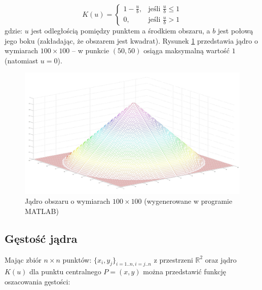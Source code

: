 \begin{equation}
\label{eq:ms3}
K(u)=\begin{cases}
1-\frac{u}{b}, & \text{jeśli }\frac{u}{b}\leq 1 \\
0, & \text{jeśli }\frac{u}{b} > 1
\end{cases}
\end{equation}
gdzie: $u$ jest odległością pomiędzy punktem a środkiem obszaru, a $b$ jest połową jego boku (zakładając, że obszarem jest kwadrat). Rysunek \ref{fig:kernel} przedstawia jądro o wymiarach $100\times 100$ -- w punkcie $(50,50)$ osiąga maksymalną wartość $1$ (natomiast $u=0$).
\begin{figure}[h]
	\centering
	\captionsetup{justification=centering,margin=1cm}
	\includegraphics[width=12cm]{2_kernel.jpg}
	\caption{Jądro obszaru o wymiarach $100\times100$ (wygenerowane w programie MATLAB)}
	\label{fig:kernel}
\end{figure}


\subsection{Gęstość jądra}
Mając zbiór $n\times n$ punktów: $\{x_{i},y_{j}\}_{i=1..n,i=j..n}$ z przestrzeni $\mathbb{R}^2$ oraz jądro $K(u)$ dla punktu centralnego $P=(x,y)$ można przedstawić funkcję oszacowania gęstości:

